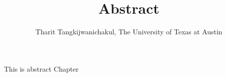 \author{Tharit Tangkijwanichakul, The University of Texas at Austin}
\title{Abstract}
\label{ch:abs}

This is abstract Chapter